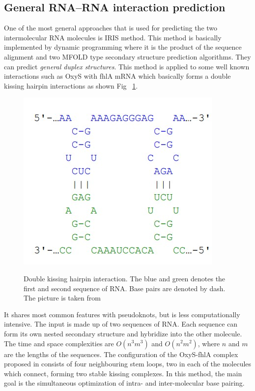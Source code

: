 \documentclass[twoside,a4paper]{report}
\begin{document}
	\subsection{General RNA–RNA interaction prediction}
	One of the most general approaches that is used for predicting the two intermolecular RNA molecules is IRIS \citep{pervouchine2004iris} method. This method is basically implemented by dynamic programming where it is the product of the sequence alignment and two MFOLD type secondary structure prediction algorithms. They can predict \textit{general duplex structures}. This method is applied to some well known interactions such as OxyS with fhlA mRNA which basically forms a double kissing hairpin interactions as shown Fig ~\ref{fig:doublekiss}.\\
	
	 \begin{figure}[tb]
		\includegraphics[width=0.4\linewidth]{doublekiss}
		\centering
		\caption{ Double kissing hairpin interaction. The blue and green denotes the first and second sequence of RNA. Base pairs are denoted by dash. The picture is taken from  } 
		\citep{wright2018structure}
		\label{fig:doublekiss}
	\end{figure}
	
	It shares most common features with pseudoknots, but is less computationally intensive. The input is made up of two sequences of RNA. Each sequence can form its own nested secondary structure and hybridize into the other molecule. The  time and space complexities are $O(n^3m^3)$ and $O(n^2m^2)$, where $n$ and $m$ are the lengths of the sequences. The configuration of the OxyS-fhlA complex proposed in \citep{argaman2000fhla} consists of four neighbouring stem loops, two in each of the molecules which connect, forming two stable kissing complexes. In this method, the main goal is the simultaneous optimization of intra- and inter-molecular base pairing.\\
\end{document}
